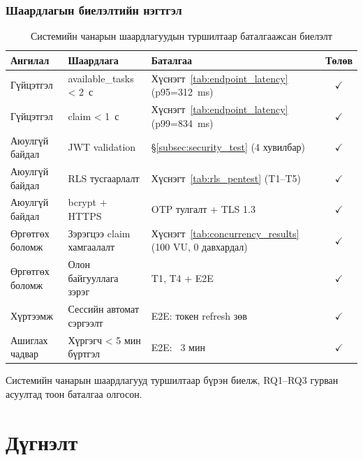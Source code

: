 \subsubsection{Шаардлагын биелэлтийн нэгтгэл}

\begin{table}[H]
\centering
\renewcommand{\arraystretch}{1.25}
\caption{Системийн чанарын шаардлагуудын туршилтаар баталгаажсан биелэлт}
\label{tab:requirement_verification}
\footnotesize
\begin{tabular}{|p{2.5cm}|p{5.5cm}|p{4cm}|c|}
\hline
\textbf{Ангилал} & \textbf{Шаардлага} & \textbf{Баталгаа} & \textbf{Төлөв} \\
\hline
Гүйцэтгэл & available\_tasks < 2~с & Хүснэгт~\ref{tab:endpoint_latency} (p95=312~ms) & $\checkmark$ \\
\hline
Гүйцэтгэл & claim < 1~с & Хүснэгт~\ref{tab:endpoint_latency} (p99=834~ms) & $\checkmark$ \\
\hline
Аюулгүй байдал & JWT validation & \S\ref{subsec:security_test} (4 хувилбар) & $\checkmark$ \\
\hline
Аюулгүй байдал & RLS тусгаарлалт & Хүснэгт~\ref{tab:rls_pentest} (T1--T5) & $\checkmark$ \\
\hline
Аюулгүй байдал & bcrypt + HTTPS & OTP тулгалт + TLS 1.3 & $\checkmark$ \\
\hline
Өргөтгөх боломж & Зэрэгцээ claim хамгаалалт & Хүснэгт~\ref{tab:concurrency_results} (100 VU, 0 давхардал) & $\checkmark$ \\
\hline
Өргөтгөх боломж & Олон байгууллага зэрэг & T1, T4 + E2E & $\checkmark$ \\
\hline
Хүртээмж & Сессийн автомат сэргээлт & E2E: токен refresh зөв & $\checkmark$ \\
\hline
Ашиглах чадвар & Хүргэгч < 5 мин бүртгэл & E2E: ~3 мин & $\checkmark$ \\
\hline
\end{tabular}
\end{table}

Системийн чанарын шаардлагууд туршилтаар бүрэн биелж, RQ1--RQ3 гурван асуултад тоон баталгаа олгосон.

\vspace{0.5cm}


\section{Дүгнэлт}
\label{sec:conclusion}

